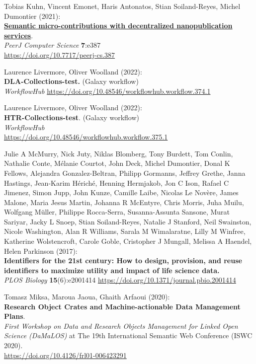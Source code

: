 \begin{thebibliography}{9}
 Tobias Kuhn, Vincent Emonet, Haris Antonatos, Stian
Soiland-Reyes, Michel Dumontier (2021):\\
\href{../../../2021/phd/nanopub/}{\textbf{Semantic micro-contributions
with decentralized nanopublication services}}.\\
\emph{PeerJ Computer Science} \textbf{7}:e387\\
\url{https://doi.org/10.7717/peerj-cs.387}

 Laurence Livermore, Oliver Woolland (2022):\\
\textbf{DLA-Collections-test.} (Galaxy workflow)\\
\emph{WorkflowHub}
\url{https://doi.org/10.48546/workflowhub.workflow.374.1}

 Laurence Livermore, Oliver Woolland (2022):\\
\textbf{HTR-Collections-test}. (Galaxy workflow)\\
\emph{WorkflowHub}\\
\url{https://doi.org/10.48546/workflowhub.workflow.375.1}

 Julie A McMurry, Nick Juty, Niklas Blomberg, Tony
Burdett, Tom Conlin, Nathalie Conte, Mélanie Courtot, John Deck, Michel
Dumontier, Donal K Fellows, Alejandra Gonzalez-Beltran, Philipp
Gormanns, Jeffrey Grethe, Janna Hastings, Jean-Karim Hériché, Henning
Hermjakob, Jon C Ison, Rafael C Jimenez, Simon Jupp, John Kunze, Camille
Laibe, Nicolas Le Novère, James Malone, Maria Jesus Martin, Johanna R
McEntyre, Chris Morris, Juha Muilu, Wolfgang Müller, Philippe
Rocca-Serra, Susanna-Assunta Sansone, Murat Sariyar, Jacky L Snoep,
Stian Soiland-Reyes, Natalie J Stanford, Neil Swainston, Nicole
Washington, Alan R Williams, Sarala M Wimalaratne, Lilly M Winfree,
Katherine Wolstencroft, Carole Goble, Cristopher J Mungall, Melissa A
Haendel, Helen Parkinson (2017):\\
\textbf{Identifiers for the 21st century: How to design, provision, and
reuse identifiers to maximize utility and impact of life science
data.}\\
\emph{PLOS Biology} \textbf{15}(6):e2001414
\url{https://doi.org/10.1371/journal.pbio.2001414}

 Tomasz Miksa, Maroua Jaoua, Ghaith Arfaoui (2020):\\
\textbf{Research Object Crates and Machine-actionable Data Management
Plans}.\\
\emph{First Workshop on Data and Research Objects Management for Linked
Open Science (DaMaLOS)} at The 19th International Semantic Web
Conference (ISWC 2020).\\
\url{https://doi.org/10.4126/frl01-006423291}



\end{thebibliography}
